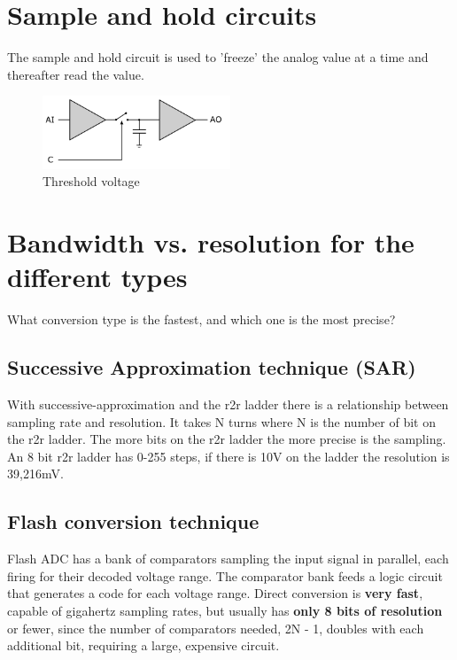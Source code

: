 \newpage
\section{Sample and hold circuits}
The sample and hold circuit is used to 'freeze' the analog value at a time and thereafter read the value.
\begin{figure}[h!]		%
	\begin{centering}
 		\includegraphics[width=0.5\textwidth]{images/sample_hold.png}
		\caption{Threshold voltage }
	\end{centering}
\end{figure}

\newpage
\section{Bandwidth vs. resolution for the different types}
What conversion type is the fastest, and which one is the most precise?

\subsection{Successive Approximation technique (SAR)}
With successive-approximation and the r2r ladder there is a relationship between sampling rate and resolution. It takes N turns where N is the number of bit on the r2r ladder. The more bits on the r2r ladder the more precise is the sampling. An 8 bit r2r ladder has 0-255 steps, if there is 10V on the ladder the resolution is 39,216mV.

\subsection{Flash conversion technique}
Flash ADC has a bank of comparators sampling the input signal in parallel, each firing for their decoded voltage range. The comparator bank feeds a logic circuit that generates a code for each voltage range. Direct conversion is \textbf{very fast}, capable of gigahertz sampling rates, but usually has \textbf{only 8 bits of resolution} or fewer, since the number of comparators needed, 2N - 1, doubles with each additional bit, requiring a large, expensive circuit.

